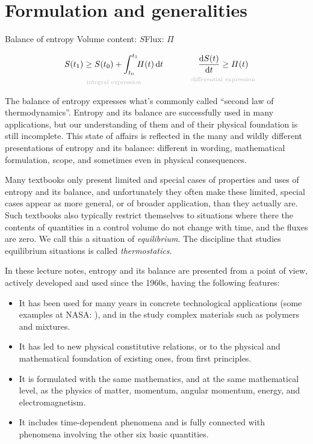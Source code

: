 \documentclass[a4paper,12pt,%
onecolumn,oneside,%
british%
]{memoir}
\newcommand*{\di}{\mathrm{d}}%
\renewcommand*{\|}[1][]{\nonscript\:#1\vert\nonscript\:\mathopen{}}
\newcommand*{\yti}{t_{0}}
\newcommand*{\ytf}{t_{1}}
\newcommand*{\dt}{\di t}
\newcommand*{\yS}{S}
\newcommand*{\yB}{\varPi}
\begin{document}
\section{Formulation and generalities}
\label{sec:bal_entropy_formulation}


\begin{definition}{Balance of entropy}
  Volume content: $\yS$\qquad Flux: $\yB$


  \begin{equation}
    \label{eq:bal_entropy}
      \underbracket[0pt]{\yS(\ytf) \ge \yS(\yti) + \int_{\yti}^{\ytf}\!\!\yB(t)\,\dt}_{\mathclap{\text{\color{grey}integral expression}}}
      \qquad%
      \qquad
      \underbracket[0pt]{\frac{\di\yS(t)}{\dt} \ge \yB(t)}_{\mathclap{\text{\color{grey}differential expression}}}
  \end{equation}
\end{definition}


The balance of entropy expresses what's commonly called \enquote{second law of thermodynamics}. Entropy and its balance are successfully used in many applications, but our understanding of them and of their physical foundation is still incomplete. This state of affairs is reflected in the many and wildly different presentations of entropy and its balance: different in wording, mathematical formulation, scope, and sometimes even in physical consequences.

Many textbooks only present limited and special cases of properties and uses of entropy and its balance, and unfortunately they often make these limited, special cases appear as more general, or of broader application, than they actually are. Such textbooks also typically restrict themselves to situations where there the contents of quantities in a control volume do not change with time, and the fluxes are zero. We call this a situation of \emph{equilibrium}. The discipline that studies equilibrium situations is called \emph{thermostatics}.

In these lecture notes, entropy and its balance are presented from a point of view, actively developed and used since the 1960s, having the following features:
\begin{itemize}[nosep]
\item It has been used for many years in concrete technological applications (some examples at NASA: \cites{changetal1971,hughesetal1986,turonetal2004,diosadyetal2018,katoetal2020}),
  and in the study complex materials such as polymers and mixtures.
\item It has led to new physical constitutive relations, or to the physical and mathematical foundation of existing ones, from first principles.
\item It is formulated with the same mathematics, and at the same mathematical level, as the physics of matter, momentum, angular momentum, energy, and electromagnetism.
\item It includes time-dependent phenomena and is fully connected with phenomena involving the other six basic quantities.
\end{itemize}
\end{document}
